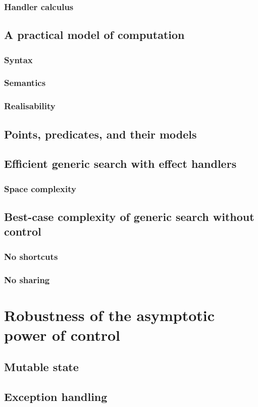\documentclass[12pt,phd,lfcs,twoside,openright,logo,leftchapter,normalheadings]{infthesis}
\theoremstyle{plain}
\theoremstyle{definition}
\begin{document}
\subsection{Handler calculus}
\section{A practical model of computation}
\subsection{Syntax}
\subsection{Semantics}
\subsection{Realisability}
\section{Points, predicates, and their models}
\section{Efficient generic search with effect handlers}
\subsection{Space complexity}
\section{Best-case complexity of generic search without control}
\subsection{No shortcuts}
\subsection{No sharing}

\chapter{Robustness of the asymptotic power of control}
\section{Mutable state}
\section{Exception handling}
\end{document}
